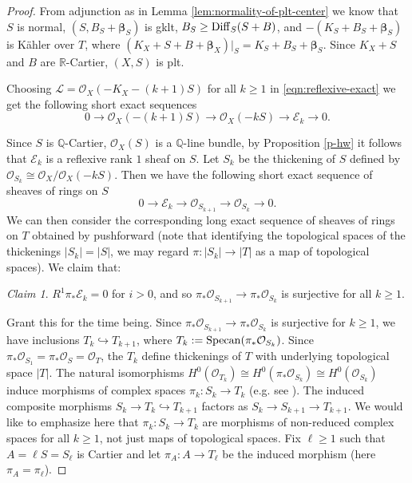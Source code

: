 \documentclass[12pt]{amsart}
\theoremstyle{plain}
\theoremstyle{remark}
\theoremstyle{definition}
\newcommand{\<}{\leq}
\def\>{\geq}
\def\mcO{\mathcal{O}}
\newcommand{\OO}{{\mathcal{O}}}
\newcommand{\Q}{{\mathbb{Q}}}
\def\injective{\hookrightarrow}
\def\>{\geq}
\def\mcO{\mathcal{O}}
\def\mcE{\mathcal{E}}
\def\mcL{\mathcal{L}}
\def\bbeta{\boldsymbol{\beta}}
\theoremstyle{definition}
\theoremstyle{definition}
\numberwithin{equation}{section}
\theoremstyle{remark}
\newtheorem{claim}[theorem]{Claim}
\begin{document}
\begin{proof}
From adjunction as in Lemma \ref{lem:normality-of-plt-center} we know that $S$ is normal, $(S,B_S+\bbeta _S)$ is gklt, $B_S\geq {\rm Diff}_S(S+B)$, and  $-(K_S+B_S+\bbeta _S) $ is K\"ahler over $T$, where $(K_X+S+B+\bbeta _X)|_S=K_S+B_S+\bbeta _S$.
Since $K_X+S$ and $B$ are $\mathbb R$-Cartier, $(X,S)$ is plt. 


Choosing $\mcL=\mcO_X(-K_X-(k+1)S)$ for all $k\>1$ in \eqref{eqn:reflexive-exact} we get the following short exact sequences
 \begin{equation}\label{eqn:reflexive-exact-k}
 0\to \OO_X(-(k+1)S)\to \OO_X(-kS)\to \mathcal E_k\to 0.
 \end{equation}

Since $S$ is $\Q$-Cartier, $\OO _X(S)$ is a $\Q$-line bundle, by Proposition \ref{p-hw} it follows that $\mcE_k$ is a reflexive rank $1$ sheaf on $S$. 
Let $S_{k}$ be the thickening of $S$ defined by $\OO_{S_k}\cong \OO_X/\OO_X(-kS)$. Then we have the following short exact sequence of sheaves of rings on $S$
\[0\to \mathcal E_k \to  \OO_{S_{k+1}}\to \OO_{S_k}\to 0 .\]
We can then consider the corresponding long exact sequence of sheaves of rings on $T$ obtained by pushforward (note that identifying the topological spaces of the thickenings $|S_k|=|S|$, we may regard $\pi:|S_k|\to |T|$ as a map of topological spaces).
We claim that: 
\begin{claim}\label{c-van} 
$R^1\pi _* \mathcal E_k =0$ for $i>0$, and so $\pi_* \OO_{S_{k+1}}\to \pi_* \OO_{S_k}$ is surjective for all $k\>1$.
\end{claim}



Grant this for the time being. Since $\pi_* \OO_{S_{k+1}}\to \pi_* \OO_{S_k}$ is surjective for $k\geq 1$,  we have inclusions $T_k\hookrightarrow T_{k+1}$, where $T_k:={\rm Specan} (\pi _* \OO_{S_{k}})$. Since $\pi_* \OO_{S_1}=\pi_*\mcO_S=\mcO_T$, the $T_k$ define thickenings  
of $T$  with underlying topological space $|T|$. The natural isomorphisms $H^0(\OO _{T_k})\cong H^0(\pi _* \OO_{S_{k}})\cong H^0(\OO _{S_k})$ induce morphisms of complex spaces $\pi _k :S_k\to T_k$ (e.g. see \cite[Exercise II.2.4]{Har77}). The induced composite morphisms $S_k\to T_k\injective T_{k+1}$ factors as $S_k\to S_{k+1}\to T_{k+1}$. We would like to emphasize here that $\pi_k:S_k\to T_k$ are morphisms of non-reduced complex spaces for all $k\geq 1$, not just maps of topological spaces.
Fix $\ell\>1$ such that $A=\ell S=S_\ell$ is Cartier and let $\pi _A:A\to T_\ell$ be the induced morphism (here $\pi_A=\pi _\ell$). 



\end{proof}
\end{document}
